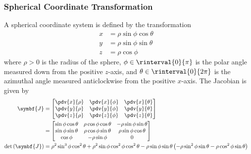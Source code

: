 \documentclass{article}
\begin{document}
\subsubsection{Spherical Coordinate Transformation}
\begin{definition}
    A spherical coordinate system is defined by the \linebreak transformation
    \begin{align*}
        x & = \rho \sin{\phi} \cos{\theta} \\
        y & = \rho \sin{\phi} \sin{\theta} \\
        z & = \rho \cos{\phi}
    \end{align*}
    where \(\rho > 0\) is the radius of the sphere,
    \(\phi \in \rinterval{0}{\pi}\) is the polar angle
    measured down from the positive \(z\)-axis,
    and \(\theta \in \rinterval{0}{2\pi}\) is the azimuthal angle measured
    anticlockwise from the positive \(x\)-axis.
    The Jacobian is given by
    \begin{align*}
        \symbf{J}                      & =
        \begin{bmatrix}
            \displaystyle\pdv{x}{\rho} & \displaystyle\pdv{x}{\phi} & \displaystyle\pdv{x}{\theta} \\
            \displaystyle\pdv{y}{\rho} & \displaystyle\pdv{y}{\phi} & \displaystyle\pdv{y}{\theta} \\
            \displaystyle\pdv{z}{\rho} & \displaystyle\pdv{z}{\phi} & \displaystyle\pdv{z}{\theta} \\
        \end{bmatrix}
        \\
                                       & =
        \begin{bmatrix}
            \sin{\phi} \cos{\theta} & \rho \cos{\phi} \cos{\theta} & -\rho \sin{\phi} \sin{\theta} \\
            \sin{\phi} \sin{\theta} & \rho \cos{\phi} \sin{\theta} & \rho \sin{\phi} \cos{\theta}  \\
            \cos{\phi}              & -\rho \sin{\phi}             & 0                             \\
        \end{bmatrix}
        \\
        \det{\left( \symbf{J} \right)} & = \rho^2 \sin^3{\phi} \cos^2{\theta} + \rho^2 \sin{\phi} \cos^2{\phi} \cos^2{\theta} - \rho \sin{\phi} \sin{\theta} \left( -\rho \sin^2{\phi} \sin{\theta} - \rho \cos^2{\phi} \sin{\theta}  \right) \\

\end{align*}
\end{definition}
\end{document}
